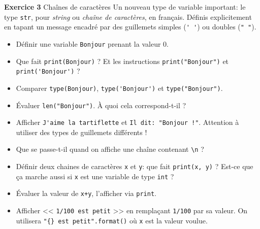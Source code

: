 \documentclass[10pt]{beamer}
\begin{document}
\begin{frame}[fragile]
	\begin{block}{\textbf{Exercice 3} Chaînes de caractères}
	Un nouveau type de variable important: le type \verb|str|, pour \textit{string} ou \textit{chaîne de caractères}, en français. Définis explicitement en tapant un message encadré par des guillemets simples (\verb|' '|) ou doubles (\verb|" "|).
	\pause
	
	\begin{itemize}[<+->]
	\item Définir une variable \verb|Bonjour| prenant la valeur $0$.
	
	\item Que fait \verb|print(Bonjour)| ? Et les instructions \verb|print("Bonjour")| et \verb|print('Bonjour')| ?
	
	\item Comparer \verb|type(Bonjour)|, \verb|type('Bonjour')| et \verb|type("Bonjour")|.
	
	\item Évaluer \verb|len("Bonjour")|. À quoi cela correspond-t-il ?
	
	\item Afficher \verb|J'aime la tartiflette| et  \verb|Il dit: "Bonjour !"|. Attention à utiliser des types de guillemets différents !
	
	\item Que se passe-t-il quand on affiche une chaîne contenant \verb|\n| ?
	
	\item Définir deux chaines de caractères \verb|x| et \verb|y|: que fait \verb|print(x, y)| ? Est-ce que ça marche aussi si \verb|x| est une variable de type \verb|int| ?
	
	\item Évaluer la valeur de \verb|x+y|, l'afficher via \verb|print|.
	
	\item Afficher << \verb|1/100 est petit| >> en remplaçant \verb|1/100| par sa valeur. On utilisera \verb|"{} est petit".format()| où \verb|x| est la valeur voulue.
	
	\end{itemize}
	\end{block}
\end{frame}
\end{document}
